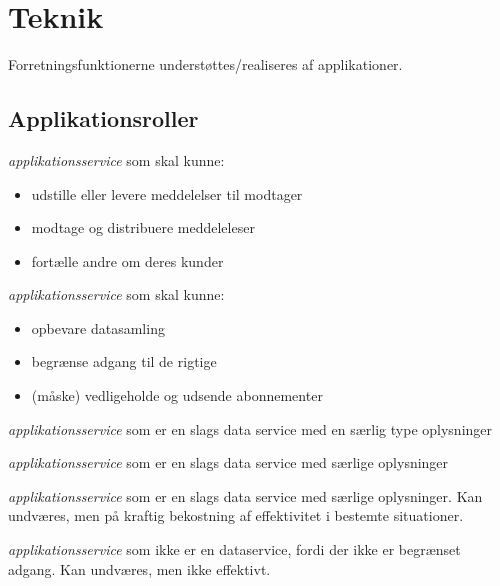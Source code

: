 \section{Teknik}\label{teknik}

Forretningsfunktionerne understøttes/realiseres af applikationer.

\subsection{Applikationsroller}\label{applikationsroller}

\begin{description}
\tightlist
\item[eDelivery Service Provider]
\emph{applikationsservice} som skal kunne:
\end{description}

\begin{itemize}
\tightlist
\item
  udstille eller levere meddelelser til modtager
\item
  modtage og distribuere meddeleleser
\item
  fortælle andre om deres kunder
\end{itemize}

\begin{description}
\tightlist
\item[Dataservice]
\emph{applikationsservice} som skal kunne:
\end{description}

\begin{itemize}
\tightlist
\item
  opbevare datasamling
\item
  begrænse adgang til de rigtige
\item
  (måske) vedligeholde og udsende abonnementer
\end{itemize}

\begin{description}
\tightlist
\item[Kontaktregister]
\emph{applikationsservice} som er en slags data service med en særlig
type oplysninger
\item[Log]
\emph{applikationsservice} som er en slags data service med særlige
oplysninger
\item[Indeks]
\emph{applikationsservice} som er en slags data service med særlige
oplysninger. Kan undværes, men på kraftig bekostning af effektivitet i
bestemte situationer.
\item[Katalog]
\emph{applikationsservice} som ikke er en dataservice, fordi der ikke er
begrænset adgang. Kan undværes, men ikke effektivt.
\end{description}

